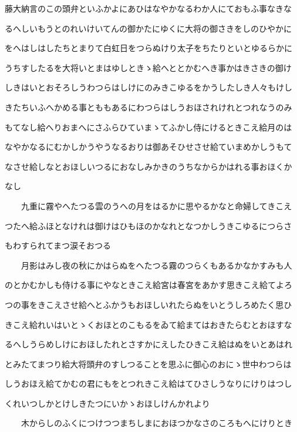 \documentclass[a4paper,11pt,landscape]{ltjtarticle}
\begin{document}
\par\medskip
藤大納言のこの頭弁といふかよにあひはなやかなるわか人にておもふ事なきな
\par\medskip
るへしいもうとのれいけいてんの御かたにゆくに大将の御さきをしのひやかに
\par\medskip
をへはしはしたちとまりて白虹日をつらぬけり太子をちたりといとゆるらかに
\par\medskip
うちすしたるを大将いとまはゆしときゝ給へととかむへき事かはきさきの御け
\par\medskip
しきはいとおそろしうわつらはしけにのみきこゆるをかうしたしき人々もけし
\par\medskip
きたちいふへかめる事とももあるにわつらはしうおほされけれとつれなうのみ
\par\medskip
もてなし給へりおまへにさふらひていまゝてふかし侍にけるときこえ給月のは
\par\medskip
なやかなるにむかしかうやうなるおりは御あそひせさせ給ていまめかしうもて
\par\medskip
なさせ給しなとおほしいつるにおなしみかきのうちなからかはれる事おほくか
\par\medskip
なし
\par\medskip
　　九重に霧やへたつる雲のうへの月をはるかに思やるかなと命婦してきこえ
\par\medskip
つたへ給ふほとなけれは御けはひもほのかなれとなつかしうきこゆるにつらさ
\par\medskip
もわすられてまつ涙そおつる
\par\medskip
　　月影はみし夜の秋にかはらぬをへたつる霧のつらくもあるかなかすみも人
\par\medskip
のとかむかしも侍ける事にやなときこえ給宮は春宮をあかす思きこえ給てよろ
\par\medskip
つの事をきこえさせ給へとふかうもおほしいれたらぬをいとうしろめたく思ひ
\par\medskip
きこえ給れいはいとゝくおほとのこもるをゐて給まてはおきたらむとおほすな
\par\medskip
るへしうらめしけにおほしたれとさすかにえしたひきこえ給はぬをいとあはれ
\par\medskip
とみたてまつり給大将頭弁のすしつることを思ふに御心のおにゝ世中わつらは
\par\medskip
しうおほえ給てかむの君にもをとつれきこえ給はてひさしうなりにけりはつし
\par\medskip
くれいつしかとけしきたつにいかゝおほしけんかれより
\par\medskip
　　木からしのふくにつけつつまちしまにおほつかなさのころもへにけりとき
\par\medskip
\end{document}
